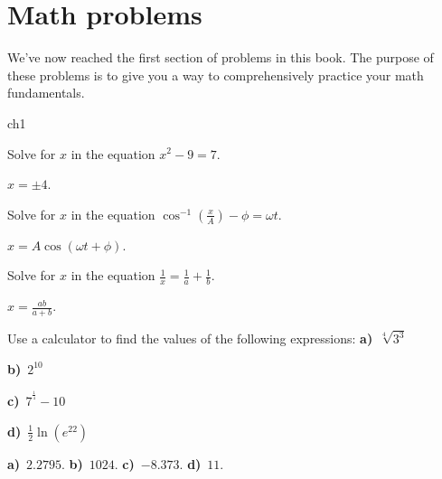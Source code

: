 

\section{Math problems}
\label{sec:math_problems}
	
	We've now reached the first section of problems in this book.
	The purpose of these problems is to give you a way to comprehensively practice your math fundamentals.

	
{\small 
	 
\begin{problems}{ch1}

	\vspace*{3mm}


	
	\begin{problem}
		Solve for $x$ in the equation $x^2-9=7$.
		\begin{answer}$x=\pm 4$.\end{answer}
	\end{problem}

	\begin{problem}
		Solve for $x$ in the equation $\cos^{-1}\!\left( \frac{x}{A} \right) - \phi = \omega t$.
		\begin{answer}$x=A\cos(\omega t+\phi)$.\end{answer}
	\end{problem}

	\begin{problem}		\label{mathprob:ch1:fractions2}
		Solve for $x$ in the equation $\frac{1}{x}=\frac{1}{a}+\frac{1}{b}$.	
		\begin{answer}$x=\frac{ab}{a+b}$.\end{answer}
	\end{problem}

	\begin{problem}
		Use a calculator to find the values of the following expressions:
		\fourcol
			\textbf{a)}~$\sqrt[4]{3^3}$
			
			\textbf{b)}~$2^{10}$
			
			\textbf{c)}~$7^{^{\frac{1}{4}}}-10$
			
			\textbf{d)}~$\frac{1}{2}\ln(e^{22})$
		\endfourcol
		\begin{answer}\textbf{a)}~$2.2795$.
					\textbf{b)}~$1024$.
					\textbf{c)}~$-8.373$.
					\textbf{d)}~$11$.\end{answer}
	\end{problem}



\end{problems}}
